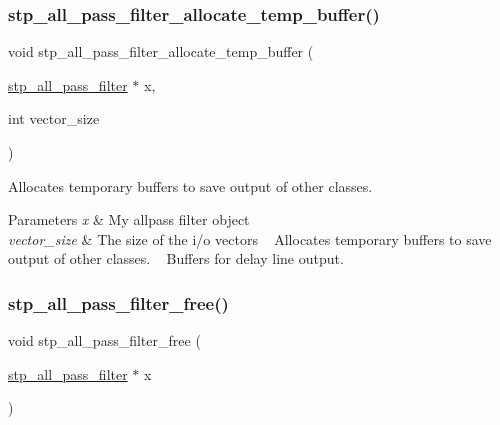 \subsubsection{\texorpdfstring{stp\+\_\+all\+\_\+pass\+\_\+filter\+\_\+allocate\+\_\+temp\+\_\+buffer()}{stp\_all\_pass\_filter\_allocate\_temp\_buffer()}}
{\footnotesize\ttfamily void stp\+\_\+all\+\_\+pass\+\_\+filter\+\_\+allocate\+\_\+temp\+\_\+buffer (\begin{DoxyParamCaption}\item[{\hyperlink{structstp__all__pass__filter}{stp\+\_\+all\+\_\+pass\+\_\+filter} $\ast$}]{x,  }\item[{int}]{vector\+\_\+size }\end{DoxyParamCaption})\hspace{0.3cm}{\ttfamily [related]}}



Allocates temporary buffers to save output of other classes. ~\newline
 


\begin{DoxyParams}{Parameters}
{\em x} & My allpass filter object ~\newline
 \\
\hline
{\em vector\+\_\+size} & The size of the i/o vectors ~\newline
 Allocates temporary buffers to save output of other classes. ~\newline
 Buffers for delay line output. ~\newline
 \\
\hline
\end{DoxyParams}
\mbox{\label{structstp__all__pass__filter_ac79aeee80479d21726015e5d7bf82b7a}} 
\subsubsection{\texorpdfstring{stp\+\_\+all\+\_\+pass\+\_\+filter\+\_\+free()}{stp\_all\_pass\_filter\_free()}}
{\footnotesize\ttfamily void stp\+\_\+all\+\_\+pass\+\_\+filter\+\_\+free (\begin{DoxyParamCaption}\item[{\hyperlink{structstp__all__pass__filter}{stp\+\_\+all\+\_\+pass\+\_\+filter} $\ast$}]{x }\end{DoxyParamCaption})\hspace{0.3cm}{\ttfamily [related]}}




